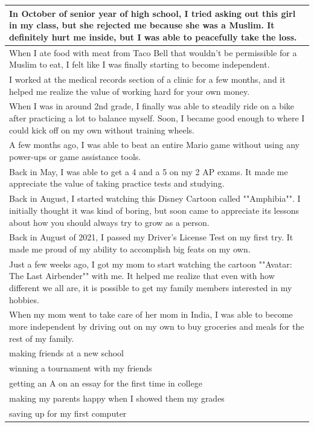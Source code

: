 \documentclass[
  .7em,
  letterpaper,
  DIV=11,
  numbers=noendperiod]{scrartcl}
\begin{document}
\begin{table}
\begin{tabular}{l}
\hline
In October of senior year of high school, I tried asking out this girl in my class, but she rejected me because she was a Muslim. It definitely hurt me inside, but I was able to peacefully take the loss.\\
\hline
When I ate food with meat from Taco Bell that wouldn't be permissible for a Muslim to eat, I felt like I was finally starting to become independent.\\
\hline
I worked at the medical records section of a clinic for a few months, and it helped me realize the value of working hard for your own money.\\
\hline
When I was in around 2nd grade, I finally was able to steadily ride on a bike after practicing a lot to balance myself. Soon, I became good enough to where I could kick off on my own without training wheels.\\
\hline
A few months ago, I was able to beat an entire Mario game without using any power-ups or game assistance tools.\\
\hline
Back in May, I was able to get a 4 and a 5 on my 2 AP exams. It made me appreciate the value of taking practice tests and studying.\\
\hline
Back in August, I started watching this Disney Cartoon called ""Amphibia"". I initially thought it was kind of boring, but soon came to appreciate its lessons about how you should always try to grow as a person.\\
\hline
Back in August of 2021, I passed my Driver's License Test on my first try. It made me proud of my ability to accomplish big feats on my own.\\
\hline
Just a few weeks ago, I got my mom to start watching the cartoon ""Avatar: The Last Airbender"" with me. It helped me realize that even with how different we all are, it is possible to get my family members interested in my hobbies.\\
\hline
When my mom went to take care of her mom in India, I was able to become more independent by driving out on my own to buy groceries and meals for the rest of my family.\\
\hline
making friends at a new school\\
\hline
winning a tournament with my friends\\
\hline
getting an A on an essay for the first time in college\\
\hline
making my parents happy when I showed them my grades\\
\hline
saving up for my first computer\\

\end{tabular}
\end{table}
\end{document}
